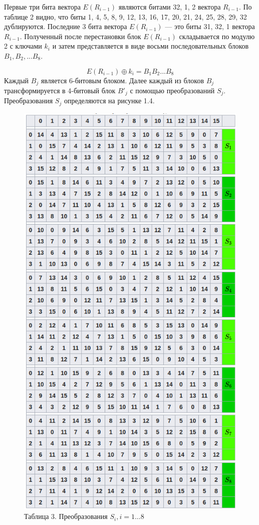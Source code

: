 Первые три бита вектора $E(R_{i-1})$ являются битами 32, 1, 2 вектора $R_{i-1}$. По таблице 2 видно, что биты 1, 4, 5, 8, 9, 12, 13, 16, 17, 20, 21, 24, 25, 28, 29, 32 дублируются. Последние 3 бита вектора $E(R_{i-1})$ — это биты 31, 32, 1 вектора $R_{i-1}$. Полученный после перестановки блок $E(R_{i-1})$ складывается по модулю 2 с ключами $k_i$ и затем представляется в виде восьми последовательных блоков $B_{1},B_{2},...B_{8}$.

\[E(R_{i-1})\oplus k_{i}=B_{1}B_{2}...B_{8}\]
Каждый $B_j$ является 6-битовым блоком. Далее каждый из блоков $B_j$ трансформируется в 4-битовый блок $B'_j$ с помощью преобразований $S_j$. Преобразования $S_j$ определяются на рисунке 1.4.

\begin{figure}[H]
\centering
\includegraphics[scale=0.7]{pict/table.png}
\caption{Таблица 3. Преобразования $S_{i}, i=1…8$}
\end{figure}

